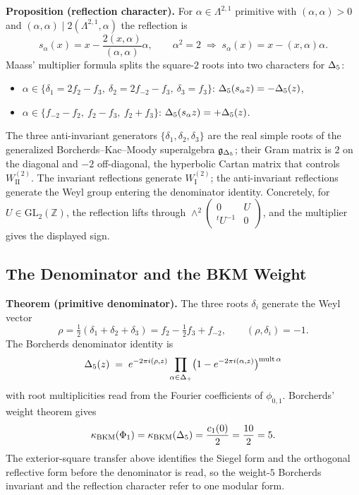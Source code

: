 \noindent\textbf{Proposition (reflection character).}
For $\alpha\in\Lambda^{2,1}$ primitive with
$(\alpha,\alpha)>0$ and $(\alpha,\alpha)\mid 2(\Lambda^{2,1},\alpha)$
the reflection is
\[
s_{\alpha}(x) = x - \frac{2(x,\alpha)}{(\alpha,\alpha)}\alpha, \qquad
\alpha^2 = 2 \;\Rightarrow\; s_{\alpha}(x) = x - (x,\alpha)\alpha.
\]
Maass' multiplier formula splits the square-$2$ roots into two
characters for $\Delta{}_{5}$:
\begin{itemize}
\item $\alpha\in\{\delta_1 = 2f_2 - f_3,\ \delta_2 = 2f_{-2} - f_3,\
\delta_3 = f_3\}$: \quad $\Delta{}_{5}(s_\alpha z) = -\Delta{}_{5}(z)$,
\item $\alpha\in\{f_{-2}-f_2,\ f_2-f_3,\ f_2+f_3\}$: \quad
$\Delta{}_{5}(s_\alpha z) = +\Delta{}_{5}(z)$.
\end{itemize}
The three anti-invariant generators $\{\delta_1,\delta_2,\delta_3\}$
are the real simple roots of the generalized Borcherds--Kac--Moody
superalgebra $\mathfrak{g}_{\Delta{}_{5}}$;
their Gram matrix is $2$ on the diagonal and $-2$ off-diagonal, the
hyperbolic Cartan matrix that controls $W^{(2)}_{\mathrm{II}}$.
The invariant reflections generate $W^{(2)}_{\mathrm{I}}$; the
anti-invariant reflections generate the Weyl group entering the
denominator identity. Concretely, for $U\in\mathrm{GL}_2(\mathbb{Z})$,
the reflection lifts through
$\wedge^2\left(\begin{smallmatrix}0&U\\{}^tU^{-1}&0\end{smallmatrix}\right)$,
and the multiplier gives the displayed sign.

\subsection*{The Denominator and the BKM Weight}

\noindent\textbf{Theorem (primitive denominator).}
The three roots $\delta_i$ generate the Weyl vector
\[
\rho = \tfrac{1}{2}(\delta_1+\delta_2+\delta_3)
= f_2 - \tfrac{1}{2}f_3 + f_{-2}, \qquad
(\rho,\delta_i)=-1 .
\]
The Borcherds denominator identity is
\[
\Delta{}_{5}(z) \;=\; e^{-2\pi i(\rho,z)}
\prod_{\alpha\in\Delta_+}\bigl(1 - e^{-2\pi i(\alpha,z)}\bigr)^{\mathrm{mult}\,\alpha}
\]
with root multiplicities read from the Fourier coefficients of
$\phi_{0,1}$. Borcherds' weight theorem gives
\[
\kappa_{\mathrm{BKM}}(\Phi_1)
=\kappa_{\mathrm{BKM}}(\Delta{}_{5})
=\frac{c_1(0)}{2}
=\frac{10}{2}
=5 .
\]
The exterior-square transfer above identifies the Siegel form and the
orthogonal reflective form before the denominator is read, so the
weight-$5$ Borcherds invariant and the reflection character refer to
one modular form.

